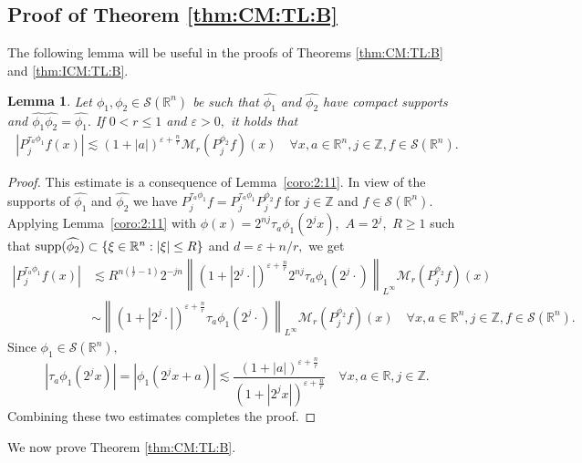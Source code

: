 \documentclass[10pt,a4paper]{article}
\newtheorem{lemma}[theorem]{Lemma}
\theoremstyle{remark}
\newcommand{\re}{\mathbb{R}}
\newcommand{\ent}{\mathbb{Z}}
\newcommand{\rn}{{{\mathbb R}^n}}
\newcommand{\sw}{{\mathcal{S}}(\rn)}
\newcommand{\M}{\mathcal{M}} %
\newcommand{\abs}[1]{\left\vert #1 \right\vert}
\newcommand{\norm}[2]{\left\|#1\right\|_{#2}}
\newcommand{\supp}{{\rm{supp}}}
\begin{document}
 
 \subsection{Proof of Theorem \ref{thm:CM:TL:B}}
 
The following lemma will be useful in the proofs of Theorems \ref{thm:CM:TL:B} and \ref{thm:ICM:TL:B}.

\begin{lemma}\label{lem:pointineq} Let $\phi_1,\phi_2\in \sw$ be  such that $\widehat{\phi_1}$ and $\widehat{\phi_2}$ have compact supports and  $\widehat{\phi_1}\widehat{\phi_2}=\widehat{\phi_1}.$  If $0<r\le 1$ and $\varepsilon>0,$ it holds that
\begin{align*}
\abs{P^{\tau_a\phi_1}_{j}f(x)}\lesssim (1+\abs{a})^{\varepsilon+\frac{n}{r}} \M_r(P^{\phi_2}_{j}f)(x)\quad \forall x,a\in\rn, j\in\ent, f\in\sw.
\end{align*}
\end{lemma}

\begin{proof} This estimate is a consequence of Lemma~\ref{coro:2:11}. In view of the supports of $\widehat{\phi_1}$ and $\widehat{\phi_2}$ we have $P^{\tau_a\phi_1}_{j}f=P^{\tau_a\phi_1}_{j}P^{\phi_2}_{j}f$ for  $j\in \ent $ and $f\in \sw.$ Applying Lemma~\ref{coro:2:11} with $\phi(x)=2^{nj}\tau_a \phi_1(2^j x),$ $A=2^j,$ $R\ge 1$ such that $\supp(\widehat{\phi_2})\subset \{\xi\in\rn:\abs{\xi}\le R\}$ and $d=\varepsilon+n/r,$ we get
\begin{align*}
\abs{P^{\tau_a\phi_1}_{j}f(x)}&\lesssim R^{n(\frac{1}{r}-1)} 2^{-jn}\norm{(1+\abs{2^j\cdot})^{\varepsilon+\frac{n}{r}}2^{nj}\tau_a \phi_1(2^j\cdot)}{L^\infty}\M_r(P^{\phi_2}_{j}f)(x)\\
&\sim \norm{(1+\abs{2^j\cdot})^{\varepsilon+\frac{n}{r}}\tau_a \phi_1(2^j\cdot)}{L^\infty}\M_r(P^{\phi_2}_{j}f)(x)\quad \forall x,a\in \rn, j\in \ent, f\in\sw.
\end{align*}
Since $\phi_1\in \sw,$ 
\[
\abs{\tau_a \phi_1(2^jx)}=\abs{\phi_1(2^j x +a)}\lesssim \frac{(1+\abs{a})^{\varepsilon+\frac{n}{r}}}{(1+\abs{2^jx})^{\varepsilon+\frac{n}{r}}}\quad \forall x,a\in \re,j\in \ent.
\]
Combining these two estimates completes the proof.
\end{proof}

We now prove Theorem \ref{thm:CM:TL:B}.
 
\end{document}
